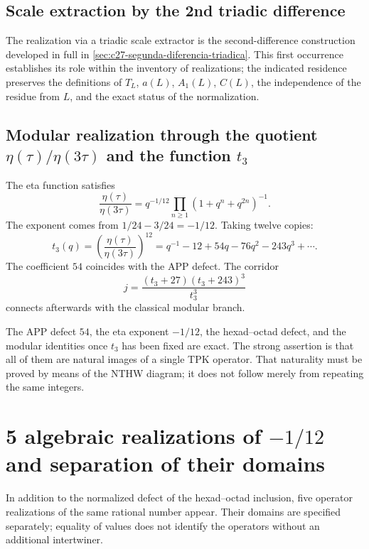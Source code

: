\subsection{Scale extraction by the 2nd triadic difference}

The realization via a triadic scale extractor is the second-difference construction
developed in full in
\cref{sec:c27-segunda-diferencia-triadica}. This first occurrence establishes its
role within the inventory of realizations; the indicated residence preserves
the definitions of \(T_L\), \(a(L)\), \(A_1(L)\), \(C(L)\), the independence
of the residue from \(L\), and the exact status of the normalization.

\subsection{Modular realization through the quotient \(\eta(\tau)/\eta(3\tau)\) and the function \(t_3\)}

The eta function satisfies
\[
\frac{\eta(\tau)}{\eta(3\tau)}
=q^{-1/12}\prod_{n\ge1}(1+q^n+q^{2n})^{-1}.
\]
The exponent comes from \(1/24-3/24=-1/12\). Taking twelve copies:
\[
t_3(q)=\left(\frac{\eta(\tau)}{\eta(3\tau)}\right)^{12}
=q^{-1}-12+54q-76q^2-243q^3+\cdots.
\]
The coefficient \(54\) coincides with the APP defect. The corridor
\[
j=\frac{(t_3+27)(t_3+243)^3}{t_3^3}
\]
connects afterwards with the classical modular branch.

\begin{remark}
The APP defect \(54\), the eta exponent \(-1/12\), the
hexad--octad defect, and the modular identities once \(t_3\) has been fixed are exact. The
strong assertion is that all of them are natural images of a single TPK operator.
That naturality must be proved by means of the NTHW diagram; it does not
follow merely from repeating the same integers.
\end{remark}


\section{5 algebraic realizations of \texorpdfstring{\(-1/12\)}{-1/12} and separation of their domains}

In addition to the normalized defect of the hexad--octad inclusion,
five operator realizations of the same rational number appear. Their domains are
specified separately; equality of values does not identify the
operators without an additional intertwiner.

